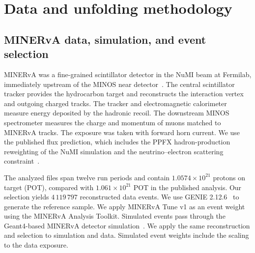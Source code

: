 \section{Data and unfolding methodology}
\label{sec:part-method}


\subsection{MINERvA data, simulation, and event selection}
\label{sec:minerva-data}
\label{sec:experiment}

MINERvA was a fine-grained scintillator detector in the NuMI beam at Fermilab, immediately upstream of the MINOS near detector~\cite{MINERvA:2013zvz}. The central scintillator tracker provides the hydrocarbon target and reconstructs the interaction vertex and outgoing charged tracks. The tracker and electromagnetic calorimeter measure energy deposited by the hadronic recoil. The downstream MINOS spectrometer measures the charge and momentum of muons matched to MINERvA tracks. The exposure was taken with forward horn current. We use the published flux prediction, which includes the PPFX hadron-production reweighting of the NuMI simulation and the neutrino--electron scattering constraint~\cite{MINERvA:2016iqn,Valencia:2019nue,MINERvA:2021owq}.

\label{sec:evloop}
The analyzed files span twelve run periods and contain $1.0574\times10^{21}$ protons on target (POT), compared with $1.061\times10^{21}$ POT in the published analysis. Our selection yields $4\,119\,797$ reconstructed data events. We use GENIE 2.12.6~\cite{Andreopoulos:2009rq} to generate the reference sample. We apply MINERvA Tune v1 as an event weight using the MINERvA Analysis Toolkit. Simulated events pass through the Geant4-based MINERvA detector simulation~\cite{GEANT4:2002zbu}. We apply the same reconstruction and selection to simulation and data. Simulated event weights include the scaling to the data exposure.

